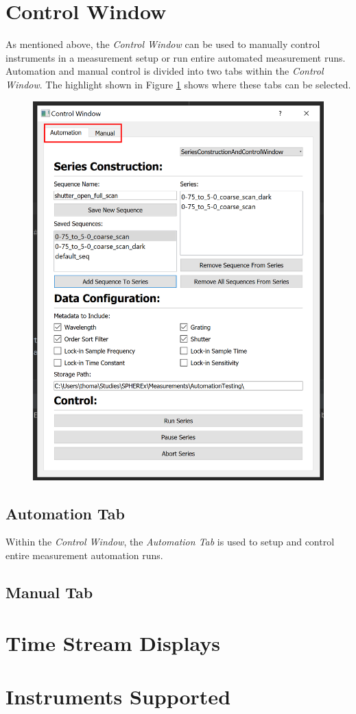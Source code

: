 \documentclass{article}
\begin{document}
\section{Control Window}

As mentioned above, the \emph{Control Window} can be used to manually control instruments in a measurement setup or run entire automated measurement runs. Automation and manual control is divided into two tabs within the \emph{Control Window}. The highlight shown in Figure \ref{Automation Window Tabs Highlighted} shows where these tabs can be selected.   

\begin{figure}[H]
\label{Automation Window Tabs Highlighted}
\centering
\includegraphics[width=0.7\linewidth]{./images/AutomationWindow_TabsHighlighted.png}
\end{figure}

\subsection{Automation Tab}

Within the \emph{Control Window}, the \emph{Automation Tab} is used to setup and control entire measurement automation runs.

\subsection{Manual Tab}

\section{Time Stream Displays}
	
\section{Instruments Supported}
	
	
	
\end{document}
